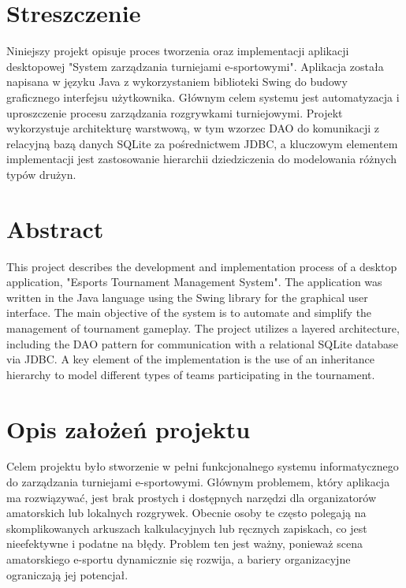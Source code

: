 \documentclass[12pt, a4paper]{article}
\begin{document}
\listoffigures
\listoftables
\listoflistings
\newpage

\section*{Streszczenie}
Niniejszy projekt opisuje proces tworzenia oraz implementacji aplikacji desktopowej "System zarządzania turniejami e-sportowymi". Aplikacja została napisana w języku Java z wykorzystaniem biblioteki Swing do budowy graficznego interfejsu użytkownika. Głównym celem systemu jest automatyzacja i uproszczenie procesu zarządzania rozgrywkami turniejowymi. Projekt wykorzystuje architekturę warstwową, w tym wzorzec DAO do komunikacji z relacyjną bazą danych SQLite za pośrednictwem JDBC, a kluczowym elementem implementacji jest zastosowanie hierarchii dziedziczenia do modelowania różnych typów drużyn.

\vspace{1cm}
\section*{Abstract}
This project describes the development and implementation process of a desktop application, "Esports Tournament Management System". The application was written in the Java language using the Swing library for the graphical user interface. The main objective of the system is to automate and simplify the management of tournament gameplay. The project utilizes a layered architecture, including the DAO pattern for communication with a relational SQLite database via JDBC. A key element of the implementation is the use of an inheritance hierarchy to model different types of teams participating in the tournament.

\newpage

\section{Opis założeń projektu}
Celem projektu było stworzenie w pełni funkcjonalnego systemu informatycznego do zarządzania turniejami e-sportowymi. Głównym problemem, który aplikacja ma rozwiązywać, jest brak prostych i dostępnych narzędzi dla organizatorów amatorskich lub lokalnych rozgrywek. Obecnie osoby te często polegają na skomplikowanych arkuszach kalkulacyjnych lub ręcznych zapiskach, co jest nieefektywne i podatne na błędy. Problem ten jest ważny, ponieważ scena amatorskiego e-sportu dynamicznie się rozwija, a bariery organizacyjne ograniczają jej potencjał.
\end{document}
